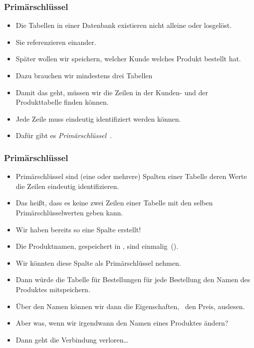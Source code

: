 \documentclass[aspectratio=169,mathserif,notheorems]{beamer}%
\begin{document}
%
%
\begin{frame}[t]%
\frametitle{Primärschlüssel}%
\begin{itemize}%
\item Die Tabellen in einer Datenbank existieren nicht alleine oder losgelöst.%
\item<2-> Sie referenzieren einander.%
\item<3-> Später wollen wir speichern, welcher Kunde welches Produkt bestellt hat.%
\item<4-> Dazu brauchen wir mindestens drei Tabellen%
\item<8-> Damit das geht, müssen wir die Zeilen in der Kunden- und der Produkttabelle finden können.%
\item<9-> Jede Zeile muss eindeutig identifiziert werden können.%
\item<10-> Dafür gibt es \emph{Primärschlüssel}~.%
\end{itemize}%
\end{frame}%
%
%
\begin{frame}[t]%
\frametitle{Primärschlüssel}%
\begin{itemize}%
\item Primärschlüssel sind (eine oder mehrere) Spalten einer Tabelle deren Werte die Zeilen eindeutig identifizieren.%
\item<2-> Das heißt, dass es keine zwei Zeilen einer Tabelle mit den selben Primärschlüsselwerten geben kann.%
\item<3-> Wir haben bereits so eine Spalte erstellt!%
\item<4-> Die Produktnamen, gespeichert in , sind einmalig~().%
\item<5-> Wir könnten diese Spalte als Primärschlüssel nehmen.%
\item<6-> Dann würde die Tabelle für Bestellungen für jede Bestellung den Namen des Produktes mitspeichern.%
\item<7-> Über den Namen können wir dann die Eigenschaften, \DEzB\ den Preis, auslesen.%
\item<8-> Aber was, wenn wir irgendwann den Namen eines Produktes ändern?%
\item<9-> Dann geht die Verbindung verloren\dots%
\end{itemize}%
\end{frame}%
\end{document}
